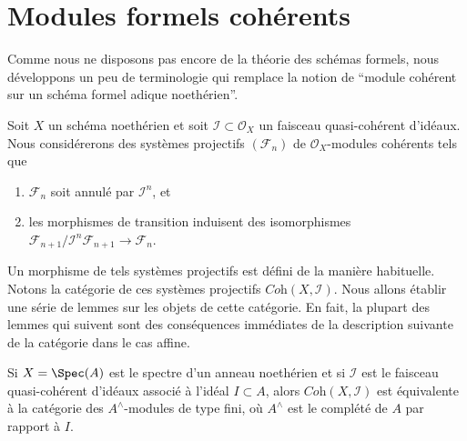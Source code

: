 \section{Modules formels cohérents}
\label{section-coherent-formal}

\noindent
Comme nous ne disposons pas encore de la théorie des schémas formels, nous
développons un peu de terminologie qui remplace la notion de ``module cohérent sur un
schéma formel adique noethérien''.

\medskip\noindent
Soit $X$ un schéma noethérien et soit $\mathcal{I} \subset \mathcal{O}_X$
un faisceau quasi-cohérent d'idéaux. Nous considérerons des systèmes
projectifs $(\mathcal{F}_n)$ de $\mathcal{O}_X$-modules cohérents tels que
\begin{enumerate}
\item $\mathcal{F}_n$ soit annulé par $\mathcal{I}^n$, et
\item les morphismes de transition induisent des isomorphismes
$\mathcal{F}_{n + 1}/\mathcal{I}^n\mathcal{F}_{n + 1} \to \mathcal{F}_n$.
\end{enumerate}
Un morphisme de tels systèmes projectifs est défini de la manière habituelle.
Notons la catégorie de ces systèmes projectifs
$\textit{Coh}(X, \mathcal{I})$. Nous allons établir
une série de lemmes sur les objets de cette catégorie. En fait, la plupart
des lemmes qui suivent sont des conséquences immédiates de la
description suivante de la catégorie dans le cas affine.

\begin{lemma}
\label{lemma-inverse-systems-affine}
Si $X = \Spec(A)$ est le spectre d'un anneau noethérien et si
$\mathcal{I}$ est le faisceau quasi-cohérent d'idéaux associé à l'idéal
$I \subset A$, alors $\textit{Coh}(X, \mathcal{I})$ est équivalente à la
catégorie des $A^\wedge$-modules de type fini, où $A^\wedge$ est le complété
de $A$ par rapport à $I$.
\end{lemma}

